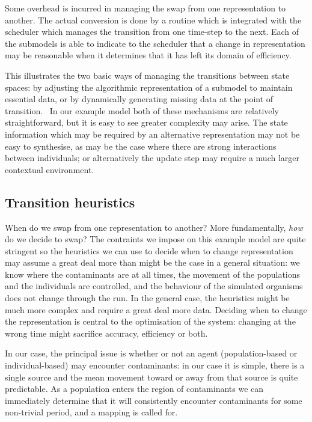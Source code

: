 \documentclass[preprint,authoryear,5p,twocolumn]{elsarticle}
\begin{document}
Some overhead is incurred in managing the swap from one representation to another. The actual conversion is done by a
routine which is integrated with the scheduler which manages the transition from one time-step to the next. Each of the
submodels is able to indicate to the scheduler that a change in representation may be reasonable when it determines
that it has left its domain of efficiency.

This illustrates the two basic ways of managing the transitions between state spaces: by adjusting the algorithmic
representation of a submodel to maintain essential data, or by dynamically generating missing data at the point of
transition. \ In our example model both of these mechanisms are relatively straightforward, but it is easy to see
greater complexity may arise. The state information which may be required by an alternative representation may not be
easy to synthesise, as may be the case where there are strong interactions between individuals; or alternatively the
update step may require a much larger contextual environment.

\subsection{Transition heuristics}

When do we swap from one representation to another? More fundamentally, {\em{how}} do we decide to swap? The
contraints we impose on this example model are quite stringent so the heuristics we can use to decide when to change
representation may assume a great deal more than might be the case in a general situation: we know where the
contaminants are at all times, the movement of the populations and the individuals are controlled, and the behaviour of
the simulated organisms does not change through the run. In the general case, the heuristics might be much more complex
and require a great deal more data. Deciding when to change the representation is central to the optimisation of the
system: changing at the wrong time might sacrifice accuracy, efficiency or both.

In our case, the principal issue is whether or not an agent (population-based or individual-based) may encounter
contaminants: in our case it is simple, there is a single source and the mean movement toward or away from that source
is quite predictable. As a population enters the region of contaminants we can immediately determine that it will
consistently encounter contaminants for some non-trivial period, and a mapping is called for.
\end{document}
